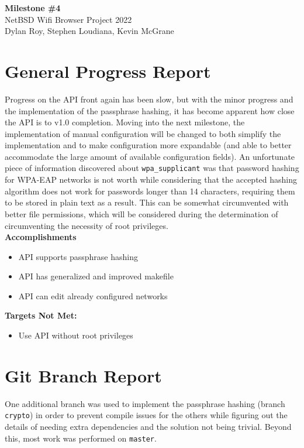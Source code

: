 \documentclass[11pt]{article}
\begin{document}
\begin{center}
  \textbf{\Large Milestone \#4}\\\large NetBSD Wifi Browser Project 2022\\
  Dylan Roy, Stephen Loudiana, Kevin McGrane
\end{center}


\section{General Progress Report}
Progress on the API front again has been slow, but with the minor progress
and the implementation of the passphrase hashing, it has become apparent
how close the API is to v1.0 completion. Moving into the next milestone, 
the implementation of manual configuration will be changed to both simplify
the implementation and to make configuration more expandable (and able to
better accommodate the large amount of available configuration fields). An
unfortunate piece of information discovered about \texttt{wpa\_supplicant}
was that password hashing for WPA-EAP networks is not worth while considering
that the accepted hashing algorithm does not work for passwords longer than
14 characters, requiring them to be stored in plain text as a result. This
can be somewhat circumvented with better file permissions, which will be considered
during the determination of circumventing the necessity of root privileges.\\

\textbf{Accomplishments}
\begin{itemize}
  \item API supports passphrase hashing
  \item API has generalized and improved makefile
  \item API can edit already configured networks
\end{itemize}

\textbf{Targets Not Met:}
\begin{itemize}
  \item Use API without root privileges
\end{itemize}


\section{Git Branch Report}
One additional branch was used to implement the passphrase hashing (branch \texttt{crypto})
in order to prevent compile issues for the others while figuring out the
details of needing extra dependencies and the solution not being trivial.
Beyond this, most work was performed on \texttt{master}.
\end{document}
